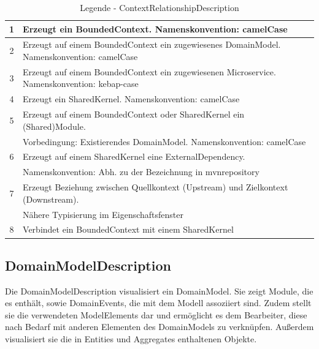 \begin{table}[h]
\centering
\footnotesize
\begin{tabularx}{\textwidth}{|c|X|}
\hline
1 & Erzeugt ein BoundedContext. Namenskonvention: camelCase \\ \hline
2 & Erzeugt auf einem BoundedContext ein zugewiesenes DomainModel. Namenskonvention: camelCase \\ \hline
3 & Erzeugt auf einem BoundedContext ein zugewiesenen Microservice. Namenskonvention: kebap-case \\ \hline
4 & Erzeugt ein SharedKernel. Namenskonvention: camelCase \\ \hline
5 & Erzeugt auf einem BoundedContext oder SharedKernel ein (Shared)Module.\\ & Vorbedingung: Existierendes DomainModel. Namenskonvention: camelCase \\ \hline
6 & Erzeugt auf einem SharedKernel eine ExternalDependency.\\ & Namenskonvention: Abh. zu der Bezeichnung in mvnrepository \\ \hline
7 & Erzeugt Beziehung zwischen Quellkontext (Upstream) und Zielkontext (Downstream).\\ &  Nähere Typisierung im Eigenschaftsfenster \\ \hline
8 & Verbindet ein BoundedContext mit einem SharedKernel \\ \hline
\end{tabularx}
\caption{Legende - ContextRelationshipDescription}
\end{table}

\subsection{DomainModelDescription}

Die \glqq DomainModelDescription\grqq{} visualisiert ein DomainModel. Sie zeigt Module, die es enthält, sowie DomainEvents, die mit dem Modell assoziiert sind. Zudem stellt sie die verwendeten ModelElements dar und ermöglicht es dem Bearbeiter, diese nach Bedarf mit anderen Elementen des DomainModels zu verknüpfen. Außerdem visualisiert sie die in Entities und Aggregates enthaltenen Objekte.

